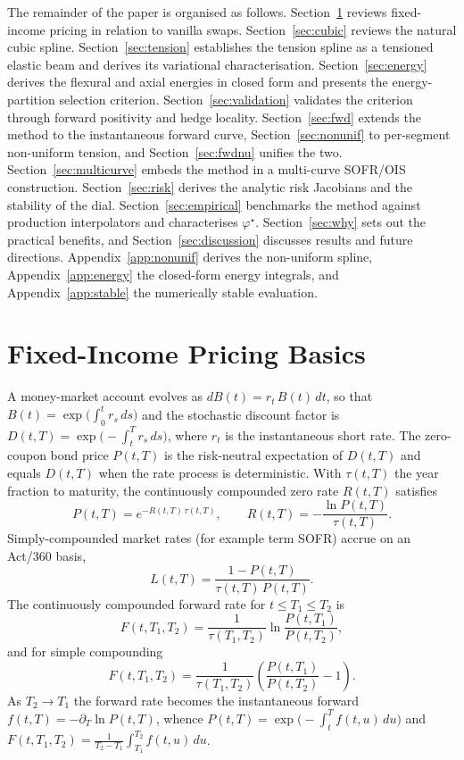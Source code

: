 \documentclass[10pt]{article}
\begin{document}
The remainder of the paper is organised as follows. Section~\ref{sec:fi} reviews fixed-income
pricing in relation to vanilla swaps. Section~\ref{sec:cubic} reviews the natural cubic spline.
Section~\ref{sec:tension} establishes the tension spline as a tensioned elastic beam and
derives its variational characterisation. Section~\ref{sec:energy} derives the flexural and
axial energies in closed form and presents the energy-partition selection criterion.
Section~\ref{sec:validation} validates the criterion through forward positivity and hedge
locality. Section~\ref{sec:fwd} extends the method to the instantaneous forward curve,
Section~\ref{sec:nonunif} to per-segment non-uniform tension, and Section~\ref{sec:fwdnu}
unifies the two. Section~\ref{sec:multicurve} embeds the method in a multi-curve SOFR/OIS
construction. Section~\ref{sec:risk} derives the analytic risk Jacobians and the stability of the
dial. Section~\ref{sec:empirical} benchmarks the method against production interpolators and
characterises $\varphi^\star$. Section~\ref{sec:why} sets out the
practical benefits, and Section~\ref{sec:discussion} discusses results and future directions.
Appendix~\ref{app:nonunif} derives the non-uniform spline, Appendix~\ref{app:energy} the
closed-form energy integrals, and Appendix~\ref{app:stable} the numerically stable evaluation.

\section{Fixed-Income Pricing Basics}\label{sec:fi}
A money-market account evolves as $dB(t)=r_t\,B(t)\,dt$, so that
$B(t)=\exp\!\big(\int_0^t r_s\,ds\big)$ and the stochastic discount factor is
$D(t,T)=\exp\!\big(-\int_t^T r_s\,ds\big)$, where $r_t$ is the instantaneous short rate. The
zero-coupon bond price $P(t,T)$ is the risk-neutral expectation of $D(t,T)$ and equals
$D(t,T)$ when the rate process is deterministic. With $\tau(t,T)$ the year fraction to
maturity, the continuously compounded zero rate $R(t,T)$ satisfies
\begin{equation}
P(t,T)=e^{-R(t,T)\,\tau(t,T)},\qquad
R(t,T)=-\frac{\ln P(t,T)}{\tau(t,T)}.
\end{equation}
Simply-compounded market rates (for example term SOFR) accrue on an Act/360 basis,
\begin{equation}
L(t,T)=\frac{1-P(t,T)}{\tau(t,T)\,P(t,T)} .
\end{equation}
The continuously compounded forward rate for $t\le T_1\le T_2$ is
\begin{equation}
F(t,T_1,T_2)=\frac{1}{\tau(T_1,T_2)}\ln\frac{P(t,T_1)}{P(t,T_2)},
\end{equation}
and for simple compounding
\begin{equation}
F(t,T_1,T_2)=\frac{1}{\tau(T_1,T_2)}\!\left(\frac{P(t,T_1)}{P(t,T_2)}-1\right). \label{eq:fwdsimple}
\end{equation}
As $T_2\to T_1$ the forward rate becomes the instantaneous forward
$f(t,T)=-\partial_T\ln P(t,T)$, whence $P(t,T)=\exp\!\big(-\int_t^T f(t,u)\,du\big)$ and
$F(t,T_1,T_2)=\tfrac{1}{T_2-T_1}\int_{T_1}^{T_2} f(t,u)\,du$.
\end{document}
